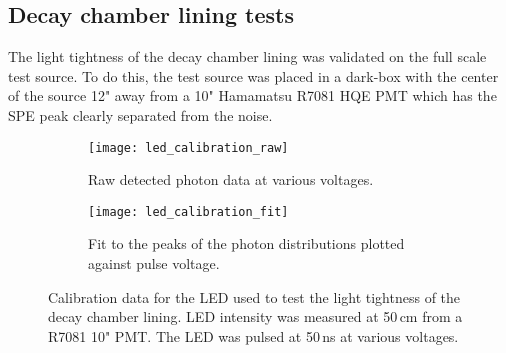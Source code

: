 \subsection{Decay chamber lining tests}
\label{sec:liningtest}
The light tightness of the decay chamber lining was validated on the full scale test source. To do this, the test source was placed in a dark-box with the center of the source 12" away from a 10" Hamamatsu R7081 HQE PMT which has the SPE peak clearly separated from the noise. 
\begin{figure}
        \begin{subfigure}{0.49\textwidth}
                \texttt{[image: led\_calibration\_raw]}
                \caption{Raw detected photon data at various voltages.}
                \label{fig:ledRAW}
        \end{subfigure}%
        \hspace{0.2cm}
        \begin{subfigure}{0.49\textwidth}
                \texttt{[image: led\_calibration\_fit]}
                \caption{Fit to the peaks of the photon distributions plotted against pulse voltage.}
                \label{fig:ledFit}
        \end{subfigure}
        \caption{Calibration data for the LED used to test the light tightness of the decay chamber lining. LED intensity was measured at 50\,cm from a R7081 10" PMT. The LED was pulsed at 50\,ns at various voltages.}
\label{fig:calibratedled1}
\end{figure}


